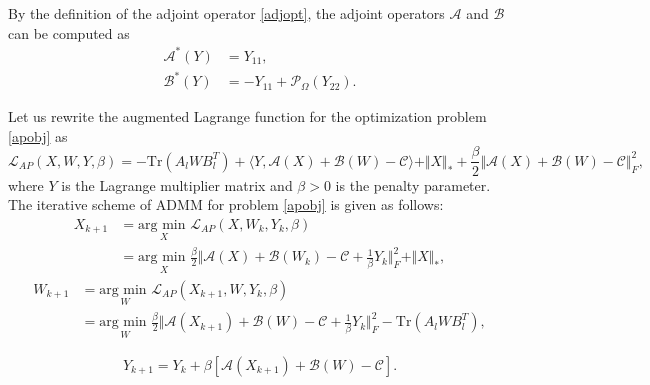 \documentclass{article}
\begin{document}
{By the definition of the adjoint operator \eqref{adjopt}, the adjoint operators  $\mathcal{A}$ and $\mathcal{B}$ can be computed as 
\begin{equation}
	\label{optab}
	\begin{aligned}
		\mathcal{A}^*(Y) & = Y_{11}, \\
		\mathcal{B}^*(Y) & = -Y_{11} + \mathcal{P}_\Omega(Y_{22}).
	\end{aligned}
\end{equation}

Let us rewrite the augmented Lagrange function for the optimization problem \eqref{apobj} as 
\begin{equation}
\mathcal{L}_{AP}(X,W,Y,\beta) = -\text{Tr}(A_lWB_l^T) + \langle Y, \mathcal{A}(X)+\mathcal{B}(W) -\mathcal{C} \rangle + \Vert X\Vert_* + \frac{\beta}{2}\Vert \mathcal{A}(X)+\mathcal{B}(W) -\mathcal{C} \Vert^2_F,
\end{equation}
where $Y$ is the Lagrange multiplier matrix and $\beta >0$ is the penalty parameter. The iterative scheme of ADMM for problem \eqref{apobj} is given as follows:
	\begin{align}
		\label{apx}
		X_{k+1} & = \underset{X}{\text{arg min }} \mathcal{L}_{AP}(X,W_k,Y_k,\beta) \nonumber\\
		& = \underset{X}{\text{arg min }}\frac{\beta}{2}\Vert \mathcal{A}(X) + \mathcal{B}(W_k) - \mathcal{C} + \frac{1}{\beta}Y_{k} \Vert_F^2 + \Vert X \Vert_*,
	\end{align}
	\begin{align}
		\label{apw}
		W_{k+1} & = \underset{W}{\text{arg min }} \mathcal{L}_{AP}(X_{k+1},W,Y_k,\beta)  \nonumber \\
		& = \underset{W}{\text{arg min }}\frac{\beta}{2}\Vert \mathcal{A}(X_{k+1}) + \mathcal{B}(W) - \mathcal{C} + \frac{1}{\beta}Y_{k} \Vert_F^2 -\text{Tr}(A_lWB_l^T),
	\end{align}

\begin{equation}
	\label{apy}
	Y_{k+1} = Y_{k}+\beta[\mathcal{A}(X_{k+1})+\mathcal{B}(W)-\mathcal{C}].
\end{equation}


}
\end{document}
